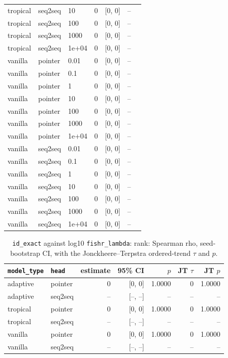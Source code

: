 \documentclass[10pt]{article}
\begin{document}
{\begin{longtable}{lllrrrl}
tropical & seq2seq & 10 & 0 & [0, 0] & -- & \\
tropical & seq2seq & 100 & 0 & [0, 0] & -- & \\
tropical & seq2seq & 1000 & 0 & [0, 0] & -- & \\
tropical & seq2seq & 1e+04 & 0 & [0, 0] & -- & \\
vanilla & pointer & 0.01 & 0 & [0, 0] & -- & \\
vanilla & pointer & 0.1 & 0 & [0, 0] & -- & \\
vanilla & pointer & 1 & 0 & [0, 0] & -- & \\
vanilla & pointer & 10 & 0 & [0, 0] & -- & \\
vanilla & pointer & 100 & 0 & [0, 0] & -- & \\
vanilla & pointer & 1000 & 0 & [0, 0] & -- & \\
vanilla & pointer & 1e+04 & 0 & [0, 0] & -- & \\
vanilla & seq2seq & 0.01 & 0 & [0, 0] & -- & \\
vanilla & seq2seq & 0.1 & 0 & [0, 0] & -- & \\
vanilla & seq2seq & 1 & 0 & [0, 0] & -- & \\
vanilla & seq2seq & 10 & 0 & [0, 0] & -- & \\
vanilla & seq2seq & 100 & 0 & [0, 0] & -- & \\
vanilla & seq2seq & 1000 & 0 & [0, 0] & -- & \\
vanilla & seq2seq & 1e+04 & 0 & [0, 0] & -- & \\
\bottomrule
\end{longtable}
}

{\small
\begin{longtable}{llrrrrr}
\caption{\texttt{id\_exact} against log10 \texttt{fishr\_lambda}: rank: Spearman rho, seed-bootstrap CI, with the Jonckheere--Terpstra ordered-trend $\tau$ and $p$.}\label{tab:trend-id_exact}\\
\toprule
\texttt{model\_type} & \texttt{head} & estimate & 95\% CI & $p$ & JT $\tau$ & JT $p$\\
\midrule
\endhead
adaptive & pointer & 0 & [0, 0] & 1.0000 & 0 & 1.0000\\
adaptive & seq2seq & -- & [--, --] & -- & -- & --\\
tropical & pointer & 0 & [0, 0] & 1.0000 & 0 & 1.0000\\
tropical & seq2seq & -- & [--, --] & -- & -- & --\\
vanilla & pointer & 0 & [0, 0] & 1.0000 & 0 & 1.0000\\
vanilla & seq2seq & -- & [--, --] & -- & -- & --\\
\bottomrule
\end{longtable}
}
\end{document}
